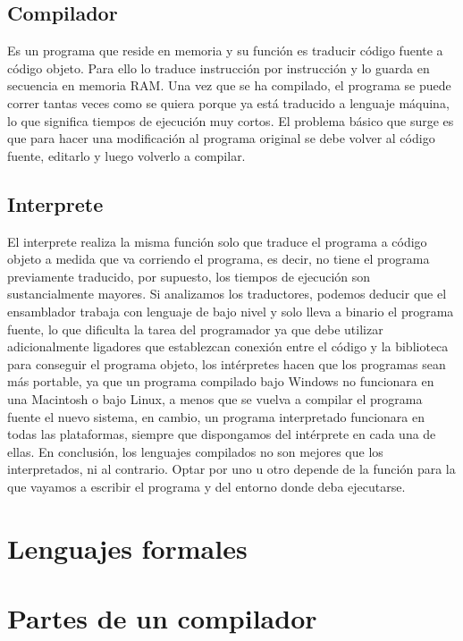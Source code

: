 \subsection{Compilador}

Es un programa que reside en memoria y su función es traducir código fuente a código objeto. Para ello lo traduce instrucción por instrucción y lo guarda en secuencia en memoria RAM. Una vez que se ha compilado, el programa se puede correr tantas veces como se quiera porque ya está  traducido a lenguaje máquina, lo que significa tiempos de ejecución muy cortos. El problema básico que surge es que para hacer una modificación al programa original se debe volver al código fuente, editarlo y luego volverlo a compilar.

\subsection{Interprete}

El interprete realiza la misma función solo que traduce el programa a código objeto a medida que va corriendo el programa, es decir, no tiene el programa previamente traducido, por supuesto, los tiempos de ejecución son sustancialmente mayores.
Si analizamos los traductores, podemos deducir que el ensamblador  trabaja con lenguaje de bajo nivel y solo lleva a binario el programa fuente, lo que dificulta la tarea del programador ya que debe utilizar adicionalmente ligadores que establezcan conexión entre el código y la biblioteca  para conseguir el programa objeto, los intérpretes hacen que los programas sean más portable, ya que un programa compilado bajo Windows no funcionara en una Macintosh o bajo Linux, a menos que se vuelva a compilar el programa fuente el nuevo sistema, en cambio, un programa interpretado funcionara en todas las plataformas, siempre que dispongamos del intérprete en cada una de ellas.
En conclusión, los lenguajes compilados no son mejores que los interpretados, ni al contrario. Optar por uno u otro depende de la función para la que vayamos a escribir el programa y del entorno donde deba ejecutarse.

\section{Lenguajes formales}

\section{Partes de un compilador}

